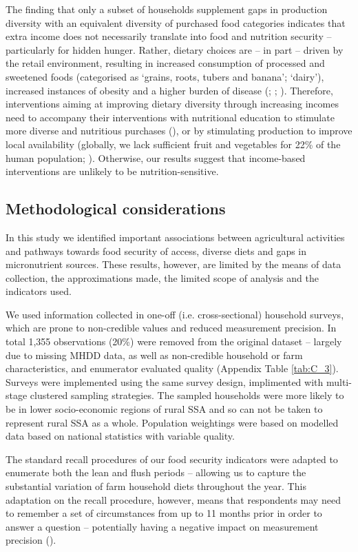 The finding that only a subset of households supplement gaps in production diversity with an equivalent diversity of purchased food categories indicates that extra income does not necessarily translate into food and nutrition security -- particularly for hidden hunger. Rather, dietary choices are -- in part -- driven by the retail environment, resulting in increased consumption of processed and sweetened foods (categorised as `grains, roots, tubers and banana'; `dairy'), increased instances of obesity and a higher burden of disease (\citealp{Demmler2018}; \citealp{GBD2016RiskFactorsCollaborators2017}; \citealp{Popkin2014}). Therefore, interventions aiming at improving dietary diversity through increasing incomes need to accompany their interventions with nutritional education to stimulate more diverse and nutritious purchases (\citealp{Dhanarajan2017}), or by stimulating production to improve local availability (globally, we lack sufficient fruit and vegetables for 22\% of the human population; \citealp{Siegel2014}). Otherwise, our results suggest that income-based interventions are unlikely to be nutrition-sensitive.

\subsection{Methodological considerations}

In this study we identified important associations between agricultural activities and pathways towards food security of access, diverse diets and gaps in micronutrient sources. These results, however, are limited by the means of data collection, the approximations made, the limited scope of analysis and the indicators used.

We used information collected in one-off (i.e. cross-sectional) household surveys, which are prone to non-credible values and reduced measurement precision. In total 1,355 observations (20\%) were removed from the original dataset -- largely due to missing MHDD data, as well as non-credible household or farm characteristics, and enumerator evaluated quality (Appendix Table \ref{tab:C_3}). Surveys were implemented using the same survey design, implimented with multi-stage clustered sampling strategies. The sampled households were more likely to be in lower socio-economic regions of rural SSA and so can not be taken to represent rural SSA as a whole. Population weightings were based on modelled data based on national statistics with variable quality.

The standard recall procedures of our food security indicators were adapted to enumerate both the lean and flush periods -- allowing us to capture the substantial variation of farm household diets throughout the year. This adaptation on the recall procedure, however, means that respondents may need to remember a set of circumstances from up to 11 months prior in order to answer a question -- potentially having a negative impact on measurement precision (\citealp{Beegle2012}).

